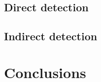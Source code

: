 \documentclass[a4paper, 11pt,notoc]{article}
\begin{document}
\subsection{Direct detection}

\subsection{Indirect detection}



\section{Conclusions}

 



\end{document}
